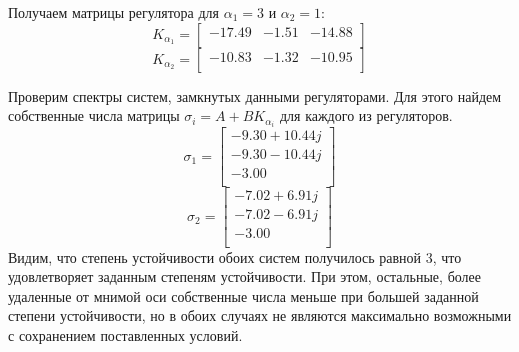 Получаем матрицы регулятора для $\alpha_1 = 3$ и $\alpha_2 = 1$:
\begin{equation}
    K_{\alpha_1} = 
    \begin{bmatrix}
        -17.49  & -1.51  & -14.88 \\ 
    \end{bmatrix}
\end{equation}
\begin{equation}
    K_{\alpha_2} = 
    \begin{bmatrix}
        -10.83  & -1.32  & -10.95 \\ 
    \end{bmatrix}
\end{equation}

Проверим спектры систем, замкнутых данными регуляторами. Для этого найдем собственные 
числа матрицы $\sigma_i = A + BK_{\alpha_i}$ для каждого из регуляторов.
\begin{equation}
    \sigma_1 = \begin{bmatrix}
        -9.30 + 10.44j \\ 
        -9.30 - 10.44j \\ 
        -3.00 \\ 
    \end{bmatrix}
\end{equation}
\begin{equation}
    \sigma_2 = \begin{bmatrix}
        -7.02 + 6.91j \\ 
        -7.02 - 6.91j \\ 
        -3.00 \\ 
    \end{bmatrix}
\end{equation}
Видим, что степень устойчивости обоих систем получилось равной 3, 
что удовлетворяет заданным степеням устойчивости. При этом, остальные, более удаленные 
от мнимой оси собственные числа меньше при большей заданной степени устойчивости, 
но в обоих случаях не являются максимально возможными с сохранением поставленных условий.

